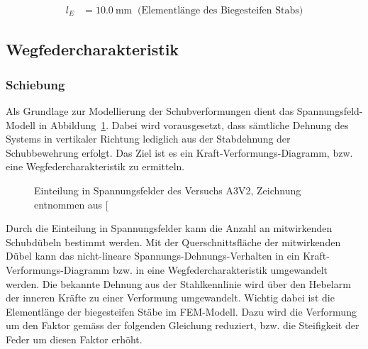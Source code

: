 \documentclass[
  11pt,
  letterpaper,
]{scrreprt}
\begin{document}
$$
\begin{aligned}
l_{E} &= 10.0\ \mathrm{mm} \; \;\textrm{(Elementlänge des Biegesteifen Stabs)}
\end{aligned}
$$

\subsection{Wegfedercharakteristik}\label{wegfedercharakteristik}

\subsubsection{Schiebung}\label{schiebung}

Als Grundlage zur Modellierung der Schubverformungen dient das
Spannungsfeld-Modell in Abbildung~\ref{fig-spannungsfelder_a3v2}. Dabei
wird vorausgesetzt, dass sämtliche Dehnung des Systems in vertikaler
Richtung lediglich aus der Stabdehnung der Schubbewehrung erfolgt. Das
Ziel ist es ein Kraft-Verformungs-Diagramm, bzw. eine
Wegfedercharakteristik zu ermitteln.

\begin{figure}[H]


\caption{\label{fig-spannungsfelder_a3v2}Einteilung in Spannungsfelder
des Versuchs A3V2, Zeichnung entnommen aus
{[}\citeproc{ref-gitz_ansatze_2024}{1}{]}}

\end{figure}%

Durch die Einteilung in Spannungsfelder kann die Anzahl an mitwirkenden
Schubdübeln bestimmt werden. Mit der Querschnittsfläche der mitwirkenden
Dübel kann das nicht-lineare Spannungs-Dehnungs-Verhalten in ein
Kraft-Verformungs-Diagramm bzw. in eine Wegfedercharakteristik
umgewandelt werden. Die bekannte Dehnung aus der Stahlkennlinie wird
über den Hebelarm der inneren Kräfte zu einer Verformung umgewandelt.
Wichtig dabei ist die Elementlänge der biegesteifen Stäbe im FEM-Modell.
Dazu wird die Verformung um den Faktor gemäss der folgenden Gleichung
reduziert, bzw. die Steifigkeit der Feder um diesen Faktor erhöht.
\end{document}
